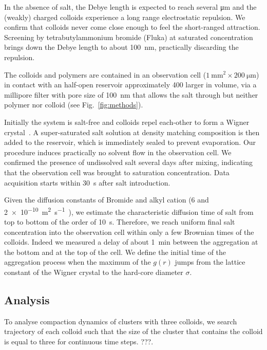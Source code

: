 In the absence of salt, the Debye length is expected to reach several \si{\micro\metre} and the (weakly) charged colloids experience a long range electrostatic repulsion. We confirm that colloids never come close enough to feel the short-ranged attraction. Screening by tetrabutylammonium bromide (Fluka) at saturated concentration brings down the Debye length to about \SI{100}{\nano\metre}, practically discarding the repulsion.

The colloids and polymers are contained in an observation cell ($\SI{1}{\milli\metre^2} \times \SI{200}{\micro\metre}$) in contact with an half-open reservoir approximately 400 larger in volume, via a millipore filter with pore size of \SI{100}{\nano\metre} that allows the salt through but neither polymer nor colloid (see Fig.~\ref{fig:methods}).

Initially the system is salt-free and colloids repel each-other to form a Wigner crystal~\cite{Royall2003}. A super-saturated salt solution at density matching composition is then added to the reservoir, which is immediately sealed to prevent evaporation. Our procedure induces practically no solvent flow in the observation cell. We confirmed the presence of undissolved salt several days after mixing, indicating that the observation cell was brought to saturation concentration. Data acquisition starts within \SI{30}{\second} after salt introduction.

Given the diffusion constants of Bromide and alkyl cation ($6$ and \SI{2e-10}{\metre^2\second^{-1}}~\cite{Campbell2005}), we estimate the characteristic diffusion time of salt from top to bottom of the order of \SI{10}{\second}. Therefore, we reach uniform final salt concentration into the observation cell within only a few Brownian times of the colloids. Indeed we measured a delay of about \SI{1}{\minute} between the aggregation at the bottom and at the top of the cell. We define the initial time of the aggregation process when the maximum of the $g(r)$ jumps from the lattice constant of the Wigner crystal to the hard-core diameter $\sigma$.


\subsection*{Analysis}

To analyse compaction dynamics of clusters with three colloids, we search trajectory of each colloid such that the size of the cluster that contains the colloid is equal to three for continuous time steps.
???.



